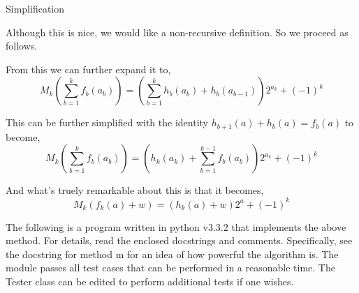 \beginsection Simplification

Although this is nice, we would like a non-recursive definition.  So
we proceed as follows.

From this we can further expand it to,
$$M_k(\sum^k_{b=1}f_b(a_b))=\left(\sum^k_{b=1}h_b(a_b)+h_b(a_{b-1})\right)2^{a_k}+(-1)^k$$

This can be further simplified with the identity
$h_{b+1}(a)+h_b(a)=f_b(a)$ to become,
$$M_k(\sum^k_{b=1}f_b(a_b))=\left(h_k(a_k)+\sum^{k-1}_{b=1}f_b(a_b)\right)2^{a_k}+(-1)^k$$

And what's truely remarkable about this is that it becomes,
$$M_k(f_k(a)+w)=(h_k(a)+w)2^a+(-1)^k$$




\vfill

The following is a program written in python v3.3.2 that implements
the above method.  For details, read the enclosed docstrings and
comments.  Specifically, see the docstring for method m for an idea of
how powerful the algorithm is.  The module passes all test cases that
can be performed in a reasonable time.  The Tester class can be edited
to perform additional tests if one wishes.

\eject



\bye
